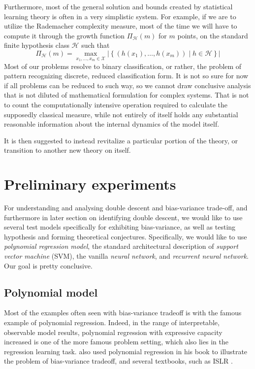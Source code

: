 Furthermore, most of the general solution and bounds created by statistical learning theory is often in a very simplistic system. For example, if we are to utilize the Rademacher complexity measure, most of the time we will have to compute it through the growth function $\Pi_{\mathcal{H}}(m)$ for $m$ points, on the standard finite hypothesis class $\mathcal{H}$ such that 
\begin{equation}
    \Pi_{\mathcal{H}}(m) = \max_{x_1, \dots, x_m \in \mathcal{X}} \left| \left\{ (h(x_1), \dots, h(x_m)) \mid h \in \mathcal{H} \right\} \right|
\end{equation}
Most of our problems resolve to binary classification, or rather, the problem of pattern recognizing discrete, reduced classification form. It is not so sure for now if all problems can be reduced to such way, so we cannot draw conclusive analysis that is not diluted of mathematical formulation for complex systems. That is not to count the computationally intensive operation required to calculate the supposedly classical measure, while not entirely of itself holds any substantial reasonable information about the internal dynamics of the model itself. 

It is then suggested to instead revitalize a particular portion of the theory, or transition to another new theory on itself. 

\clearpage
\section{Preliminary experiments}

For understanding and analysing double descent and bias-variance trade-off, and furthermore in later section on identifying double descent, we would like to use several test models specifically for exhibiting bias-variance, as well as testing hypothesis and forming theoretical conjectures. Specifically, we would like to use \textit{polynomial regression model}, the standard architectural description of \textit{support vector machine} (SVM), the vanilla \textit{neural network}, and \textit{recurrent neural network}. Our goal is pretty conclusive. 

\subsection{Polynomial model}
Most of the examples often seen with bias-variance tradeoff is with the famous example of polynomial regression. Indeed, in the range of interpretable, observable model results, polynomial regression with expressive capacity increased is one of the more famous problem setting, which also lies in the regression learning task. \cite{goodfellow2016deep} also used polynomial regression in his book to illustrate the problem of bias-variance tradeoff, and several textbooks, such as ISLR \cite{gareth_james_introduction_2013}. 

